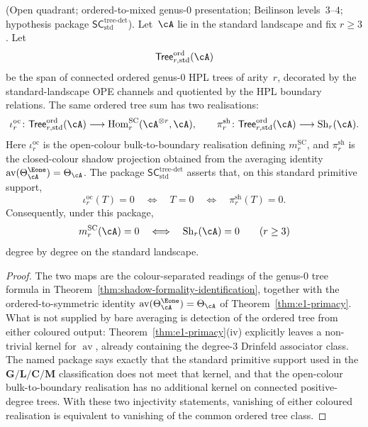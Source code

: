 \begin{lemma}
\label{lem:sc-tree-detection-standard}
\textup{(}Open quadrant; ordered-to-mixed genus-$0$
presentation; Beilinson levels~$3$--$4$; hypothesis package
$\mathsf{SC}^{\mathrm{tree}\text{-}\mathrm{det}}_{\mathrm{std}}$\textup{).}
Let~$\cA$ lie in the standard landscape and fix $r \geq 3$.
Let
\[
\mathsf{Tree}^{\mathrm{ord}}_{r,\mathrm{std}}(\cA)
\]
be the span of connected ordered genus-$0$ HPL trees of arity~$r$,
decorated by the standard-landscape OPE channels and quotiented by
the HPL boundary relations.  The same ordered tree sum has two
realisations:
\[
\iota^{\mathrm{oc}}_r\colon
\mathsf{Tree}^{\mathrm{ord}}_{r,\mathrm{std}}(\cA)
\longrightarrow
\mathrm{Hom}^{\mathrm{SC}}_r(\cA^{\otimes r},\cA),
\qquad
\pi^{\mathrm{sh}}_r\colon
\mathsf{Tree}^{\mathrm{ord}}_{r,\mathrm{std}}(\cA)
\longrightarrow
\operatorname{Sh}_r(\cA).
\]
Here $\iota^{\mathrm{oc}}_r$ is the open-colour
bulk-to-boundary realisation defining $m_r^{\mathrm{SC}}$, and
$\pi^{\mathrm{sh}}_r$ is the closed-colour shadow projection obtained
from the averaging identity
$\operatorname{av}(\Theta_\cA^{\Eone})=\Theta_\cA$.
The package
$\mathsf{SC}^{\mathrm{tree}\text{-}\mathrm{det}}_{\mathrm{std}}$
asserts that, on this standard primitive support,
\[
\iota^{\mathrm{oc}}_r(T)=0
\quad\Longleftrightarrow\quad
T=0
\quad\Longleftrightarrow\quad
\pi^{\mathrm{sh}}_r(T)=0 .
\]
Consequently, under this package,
\[
m_r^{\mathrm{SC}}(\cA)=0
\quad\Longleftrightarrow\quad
\operatorname{Sh}_r(\cA)=0
\qquad (r\geq3)
\]
degree by degree on the standard landscape.
\end{lemma}

\begin{proof}
The two maps are the colour-separated readings of the genus-$0$ tree
formula in Theorem~\ref{thm:shadow-formality-identification}, together
with the ordered-to-symmetric identity
$\operatorname{av}(\Theta_\cA^{\Eone})=\Theta_\cA$
of Theorem~\ref{thm:e1-primacy}.  What is not supplied by bare
averaging is detection of the ordered tree from either coloured
output: Theorem~\ref{thm:e1-primacy}(iv) explicitly leaves a
non-trivial kernel for $\operatorname{av}$, already containing the
degree-$3$ Drinfeld associator class.  The named package says exactly
that the standard primitive support used in the
$\mathbf G/\mathbf L/\mathbf C/\mathbf M$ classification does not meet
that kernel, and that the open-colour bulk-to-boundary realisation has
no additional kernel on connected positive-degree trees.  With these
two injectivity statements, vanishing of either coloured realisation is
equivalent to vanishing of the common ordered tree class.
\end{proof}

